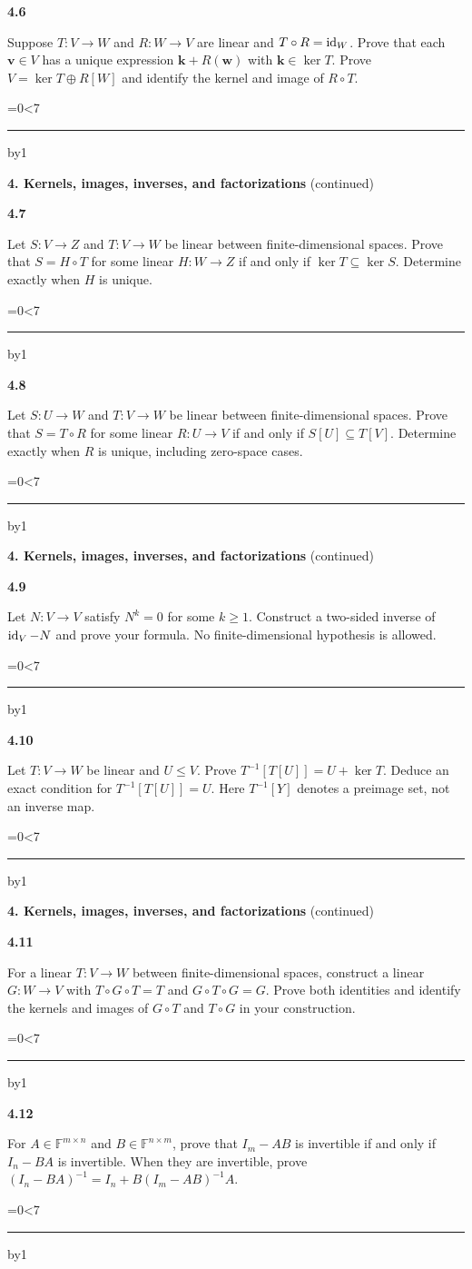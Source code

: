 \documentclass[11pt,letterpaper]{article}
\newcommand{\topicshort}{Problem collection}
\newcommand{\F}{\mathbb F}\newcommand{\R}{\mathbb R}\newcommand{\Q}{\mathbb Q}\newcommand{\C}{\mathbb C}\newcommand{\Z}{\mathbb Z}
\newcommand{\ruled}[1]{\par\begingroup\parskip=0pt\baselineskip=17pt\count255=0\loop\ifnum\count255<#1\noindent\textcolor{black!17}{\rule{\linewidth}{.25pt}}\par\advance\count255 by1\repeat\endgroup}
\newcommand{\problem}[4]{\noindent\begin{minipage}[t][3.48in][t]{\linewidth}\textbf{\color{navy}#1}\quad{\small\sffamily\color{teal}#2#3}\par #4\par\vfill\ruled{7}\end{minipage}}
\begin{document}
\par\vspace{14pt}
\problem{4.6}{M}{}{Suppose $T:V\to W$ and $R:W\to V$ are linear and $T\circ R=\operatorname{id}_W$. Prove that each $\mathbf v\in V$ has a unique expression $\mathbf k+R(\mathbf w)$ with $\mathbf k\in\ker T$. Prove $V=\ker T\oplus R[W]$ and identify the kernel and image of $R\circ T$.}
\newpage
\renewcommand{\topicshort}{Kernels and inverses}
{\large\bfseries\color{navy}4. Kernels, images, inverses, and factorizations} {\small(continued)}\par\vspace{9pt}
\problem{4.7}{M}{}{Let $S:V\to Z$ and $T:V\to W$ be linear between finite-dimensional spaces. Prove that $S=H\circ T$ for some linear $H:W\to Z$ if and only if $\ker T\subseteq\ker S$. Determine exactly when $H$ is unique.}
\par\vspace{14pt}
\problem{4.8}{M}{}{Let $S:U\to W$ and $T:V\to W$ be linear between finite-dimensional spaces. Prove that $S=T\circ R$ for some linear $R:U\to V$ if and only if $S[U]\subseteq T[V]$. Determine exactly when $R$ is unique, including zero-space cases.}
\newpage
\renewcommand{\topicshort}{Kernels and inverses}
{\large\bfseries\color{navy}4. Kernels, images, inverses, and factorizations} {\small(continued)}\par\vspace{9pt}
\problem{4.9}{M}{}{Let $N:V\to V$ satisfy $N^k=0$ for some $k\ge1$. Construct a two-sided inverse of $\operatorname{id}_V-N$ and prove your formula. No finite-dimensional hypothesis is allowed.}
\par\vspace{14pt}
\problem{4.10}{M}{}{Let $T:V\to W$ be linear and $U\le V$. Prove $T^{-1}[T[U]]=U+\ker T$. Deduce an exact condition for $T^{-1}[T[U]]=U$. Here $T^{-1}[Y]$ denotes a preimage set, not an inverse map.}
\newpage
\renewcommand{\topicshort}{Kernels and inverses}
{\large\bfseries\color{navy}4. Kernels, images, inverses, and factorizations} {\small(continued)}\par\vspace{9pt}
\problem{4.11}{C}{}{For a linear $T:V\to W$ between finite-dimensional spaces, construct a linear $G:W\to V$ with $T\circ G\circ T=T$ and $G\circ T\circ G=G$. Prove both identities and identify the kernels and images of $G\circ T$ and $T\circ G$ in your construction.}
\par\vspace{14pt}
\problem{4.12}{C}{}{For $A\in\F^{m\times n}$ and $B\in\F^{n\times m}$, prove that $I_m-AB$ is invertible if and only if $I_n-BA$ is invertible. When they are invertible, prove $(I_n-BA)^{-1}=I_n+B(I_m-AB)^{-1}A$.}
\end{document}

